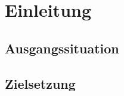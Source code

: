 \chapter{Einleitung}
\label{cha:Einleitung}

\section{Ausgangssituation}

\section{Zielsetzung}





